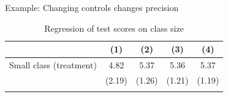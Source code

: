 \documentclass{beamer} %
\begin{document}
\begin{frame}{Example: Changing controls changes precision}

\begin{table}[htbp]
\tiny
\begin{center}
\caption{Regression of test scores on class size}
\begin{tabular*}{0.7\linewidth}{@{\hskip\tabcolsep\extracolsep\fill}l*{4}{c}@{}}
\toprule
					&\multicolumn{1}{c}{(1)} &\multicolumn{1}{c}{(2)} &\multicolumn{1}{c}{(3)} &\multicolumn{1}{c}{(4)}  \\
\midrule
	\addlinespace											

Small class (treatment)	&	4.82	&	5.37&	5.36	&	5.37	\\
	&	(\colorbox[rgb]{1,1,0}{2.19})	&	(\colorbox[rgb]{1,1,0}{1.26})	&	(\colorbox[rgb]{1,1,0}{1.21})	&	(\colorbox[rgb]{1,1,0}{1.19})	\\
	\addlinespace											


\end{tabular*}
\end{center}
\end{table}
\end{frame}
\end{document}

